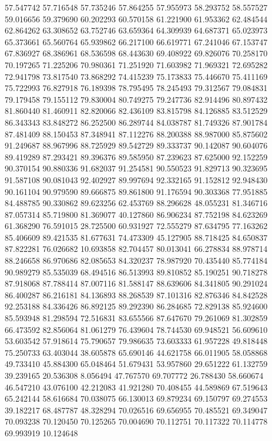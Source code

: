 57.547742
57.716548
57.735246
57.864255
57.955973
58.293752
58.557527
59.016656
59.379690
60.202293
60.570158
61.221900
61.953362
62.484544
62.864262
63.308652
63.752746
63.659364
64.309939
64.687371
65.023973
65.373661
65.560764
65.939862
66.217100
66.619771
67.241046
67.153747
67.836927
68.386961
68.536598
68.443630
69.408922
69.826076
70.258170
70.197265
71.225206
70.980361
71.251920
71.603982
71.969321
72.695282
72.941798
73.817540
73.868292
74.415239
75.173833
75.446670
75.411169
75.722993
76.827918
76.189398
78.795495
78.245493
79.312567
79.084831
79.179458
79.155112
79.830004
80.749275
79.247736
82.914496
80.897432
81.860440
81.460911
82.820066
82.436109
83.815798
84.126885
83.512529
86.343343
83.848272
86.252500
86.289744
84.038787
81.749326
87.901784
87.481409
88.150453
87.348941
87.112276
88.200388
88.987000
85.875602
91.249687
88.967996
88.725929
89.542729
89.333737
90.142087
90.604076
89.419289
87.293421
89.396376
89.585950
87.239623
87.625000
92.152259
90.370154
90.880336
91.682037
91.254581
90.550523
91.829713
90.323695
91.587108
90.081043
92.402927
89.997694
92.332165
91.152812
92.948430
90.161104
90.979590
89.666875
89.861800
91.176594
90.303368
77.951885
84.488785
90.330862
89.623256
62.453769
88.296628
48.055231
81.346716
87.057314
85.719800
81.369077
40.127860
86.906234
87.752198
84.623269
61.368290
76.591015
28.725500
60.931927
72.555279
87.634795
77.163262
85.406609
89.421535
81.677631
74.473309
45.127905
88.718425
84.650837
87.822281
76.026682
10.693858
82.704457
80.013041
66.278834
88.978714
88.246658
86.970686
82.085653
84.320237
78.987920
70.435440
85.774184
90.989279
85.535039
68.494516
86.513993
89.810852
85.190251
90.718278
87.918068
87.788414
87.007116
81.588147
88.639606
84.341805
90.291024
86.400287
86.216181
84.136893
88.268539
87.101316
82.876346
84.842528
92.253188
84.336426
86.892125
89.292390
86.284685
72.829138
85.924600
85.593948
81.298594
72.516831
83.655566
87.647670
79.261069
81.302859
66.473592
82.856064
81.061279
76.439604
78.744530
69.948521
56.609610
53.603542
57.918614
75.790657
79.986635
73.603333
61.957228
49.818448
75.250733
63.403044
38.605878
65.690146
44.621758
66.011905
58.058868
49.733410
45.884300
65.048464
51.679431
53.957860
29.651222
61.132759
39.239165
20.536308
8.056494
47.767570
69.707772
26.788430
58.660674
46.547210
43.076100
42.212083
41.921280
70.408455
44.589869
67.519643
65.242144
58.616684
70.038075
66.130013
69.879234
69.150797
69.274553
39.182217
68.487787
48.328294
70.026516
69.656955
70.485521
69.349047
70.093238
70.120450
70.125265
70.004690
70.112751
70.117322
70.114778
69.993919
10.124648
